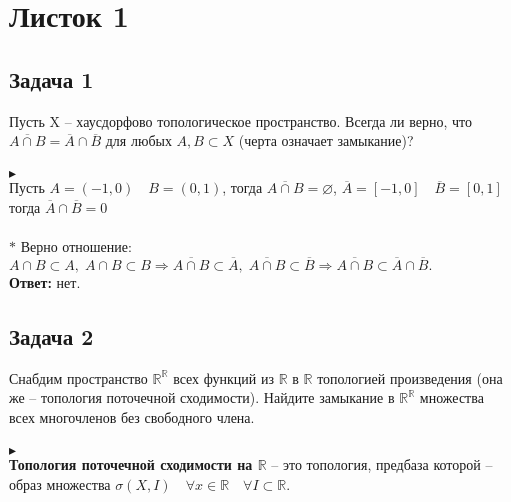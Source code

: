 \newpage
	\section{Листок 1}
		\subsection*{Задача 1}
		Пусть X -- хаусдорфово топологическое пространство. Всегда ли верно, что $\overline{A \cap B} = \overline{A} \cap \overline{B}$ для любых $A, B \subset X$ (черта означает замыкание)?\\
		\\
		$\blacktriangleright$\\
		Пусть $A = (-1, 0)\quad B = (0, 1)$, тогда $\overline{A \cap B} = \varnothing$, $\overline{A} = [-1, 0]\quad \overline{B} = [0, 1]$ тогда $\overline{A} \cap \overline{B} = 0$\\
		\\
		$*$ Верно отношение: $A \cap B \subset A, \; A \cap B \subset B \Rightarrow \overline{A \cap B} \subset \overline{A}, \; \overline{A \cap B} \subset \overline{B} \Rightarrow \overline{A \cap B} \subset \overline{A} \cap \overline{B}.$\\
		\textbf{Ответ:} нет.\\
		\begin{comment}
			Определим топологию на $\mathbb{R}^{1}$, порожденную стандартной Евклидовой метрикой.\\
			$A = (-\infty, 0), \; B = (0, +\infty) \Rightarrow \overline{A \cap B} = \varnothing, \; \overline{A} \cap \overline{B} = \{0\} \neq \varnothing \Rightarrow$ не всегда верно равенство.\\
		\end{comment}
	
	
		\subsection*{Задача 2}
		Снабдим пространство $\mathbb{R}^{\mathbb{R}}$ всех функций из $\mathbb{R}$ в $\mathbb{R}$ топологией произведения (она же -- топология поточечной сходимости). Найдите замыкание в $\mathbb{R}^{\mathbb{R}}$ множества всех многочленов без свободного члена.\\
		\\		
		$\blacktriangleright$\\
		\textbf{Топология поточечной сходимости на $\mathbb{R}$} -- это топология, предбаза которой -- образ множества $\sigma(X, I) \quad \forall x \in \mathbb{R} \quad \forall I \subset \mathbb{R}.$\\
		
